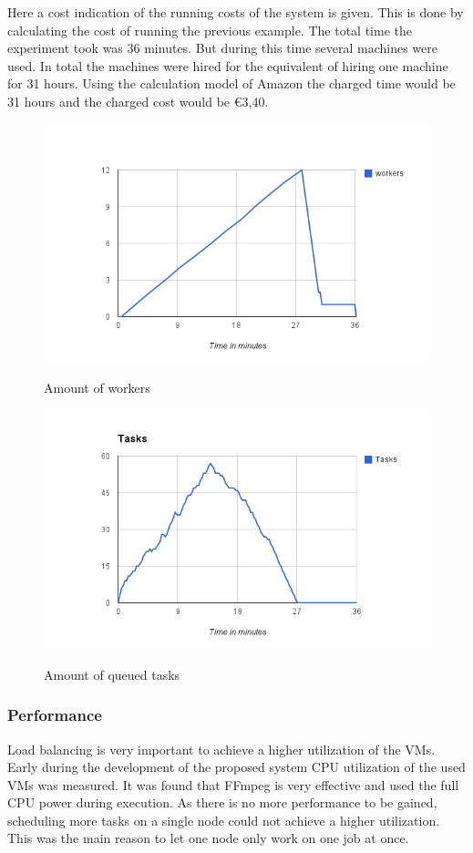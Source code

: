 \documentclass[a4paper]{IEEEtran}
\begin{document}
Here a cost indication of the running costs of the system is given.
This is done by calculating the cost of running the previous example.
The total time the experiment took was 36 minutes.
But during this time several machines were used.
In total the machines were hired for the equivalent of hiring one machine for 31 hours.
Using the calculation model of Amazon the charged time would be 31 hours and the charged cost would be \euro 3,40.


\begin{figure}[ht]
	\includegraphics[scale=0.45]{fig/100workers.png}
	\label{fig:100-workers}
	\caption{Amount of workers}
\end{figure}

\begin{figure}[ht]
	\includegraphics[scale=0.45]{fig/100tasks.png}
	\label{fig:100-tasks}
	\caption{Amount of queued tasks}
\end{figure}

\subsubsection{Performance}
Load balancing is very important to achieve a higher utilization of the VMs.
Early during the development of the proposed system CPU utilization of the used VMs was measured.
It was found that FFmpeg is very effective and used the full CPU power during execution.
As there is no more performance to be gained, scheduling more tasks on a single node could not achieve a higher utilization.
This was the main reason to let one node only work on one job at once.
\end{document}
